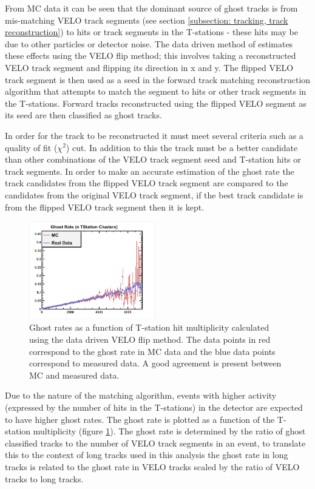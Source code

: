 From MC data it can be seen that the dominant source of ghost tracks is from mis-matching VELO track segments (see section \ref{subsection: tracking, track reconstruction}) to hits or track segments in the T-stations - these hits may be due to other particles or detector noise. The data driven method of estimates these effects using the VELO flip method; this involves taking a reconstructed VELO track segment and flipping its direction in x and y. The flipped VELO track segment is then used as a seed in the forward track matching reconstruction algorithm that attempts to match the segment to hits or other track segments in the T-stations. Forward tracks reconstructed using the flipped VELO segment as its seed are then classified as ghost tracks.

In order for the track to be reconstructed it must meet several criteria such as a quality of fit ($\chi^2$) cut. In addition to this the track must be a better candidate than other combinations of the VELO track segment seed and T-station hits or track segments. In order to make an accurate estimation of the ghost rate the track candidates from the flipped VELO track segment are compared to the candidates from the original VELO track segment, if the best track candidate is from the flipped VELO track segment then it is kept.

\begin{figure}[h]
	\centering
	\includegraphics[width=0.49\textwidth]{Chapters/multiplicity/images/ghost_rate_data_driven.png}
	\caption{Ghost rates as a function of T-station hit multiplicity calculated using the data driven VELO flip method. The data points in red correspond to the ghost rate in MC data and the blue data points correspond to measured data. A good agreement is present between MC and measured data.}
	\label{fig: ghost rates, velo flip}
\end{figure}

Due to the nature of the matching algorithm, events with higher activity (expressed by the number of hits in the T-stations) in the detector are expected to have higher ghost rates. The ghost rate is plotted as a function of the T-station multiplicity (figure \ref{fig: ghost rates, velo flip}). The ghost rate is determined by the ratio of ghost classified tracks to the number of VELO track segments in an event, to translate this to the context of long tracks used in this analysis the ghost rate in long tracks is related to the ghost rate in VELO tracks scaled by the ratio of VELO tracks to long tracks. 

